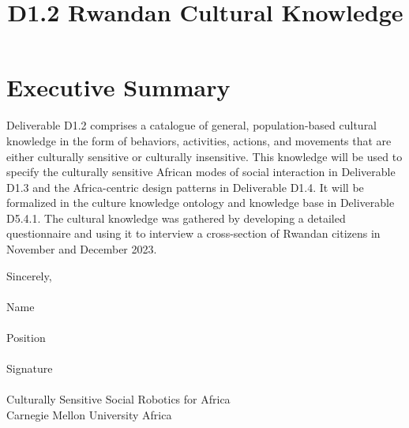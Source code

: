 \documentclass[12pt,a4paper]{article}
\begin{document}



\title{D1.2 Rwandan Cultural Knowledge}    %

\partner{}                                %




\maketitle



\section*{Executive Summary}
\label{executive_summary}
 
Deliverable D1.2  comprises a catalogue of general, population-based cultural knowledge in the form of behaviors, activities, actions, and movements that are either culturally sensitive or culturally insensitive. This knowledge will be used to specify the culturally sensitive African modes of social interaction in Deliverable D1.3 and the Africa-centric design patterns in Deliverable D1.4. It will be formalized in the culture knowledge ontology and knowledge base in Deliverable D5.4.1.  The cultural knowledge was gathered by developing a detailed questionnaire and using it  to interview a cross-section of Rwandan citizens in November and December 2023. 



\newpage

 
\pagebreak
\tableofcontents
\newpage


\vspace{1cm}
\noindent Sincerely, \\
\\
Name \underline{\hspace{4cm}} \\
\\
Position \underline{\hspace{4cm}} \\
\\
Signature \underline{\hspace{4cm}} \\
\\
Culturally Sensitive Social Robotics for Africa\\
Carnegie Mellon University Africa
\newpage
\end{document}
